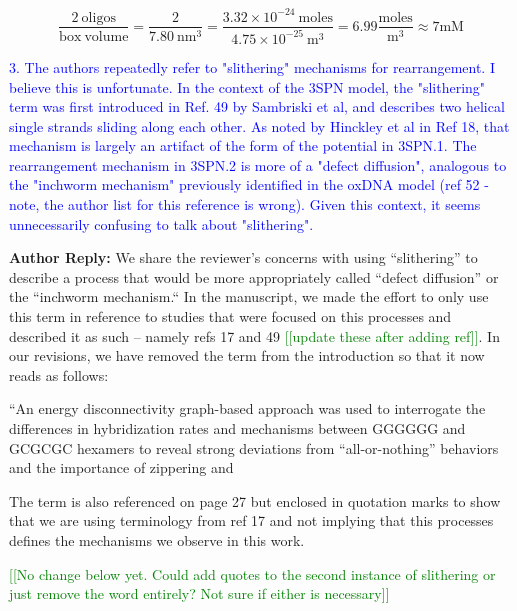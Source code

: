 \documentclass[11pt,a4paper]{letter} %
\newcommand*{\rood}[1]{{\color{red}{#1}}}
\newcommand*{\noteg}[1]{\textcolor{green}{[[#1]]}}		%
\begin{document}
    \begin{equation}\label{}
	\frac{2 \mathrm{\:oligos}}{\mathrm{box\:volume}} = \frac{2}{7.80\mathrm{\:nm}^3} = 
	\frac{3.32 \times 10^{-24} \mathrm{\:moles}}{4.75 \times 10^{-25} \mathrm{\:m}^3} = 
	6.99 \frac{\mathrm{moles}}{\mathrm{m}^3} \approx 7\mathrm{mM}
	\end{equation}

\textcolor{blue}{3.  The authors repeatedly refer to "slithering" mechanisms for rearrangement. I believe this is unfortunate. In the context of the 3SPN model, the "slithering" term was first introduced in Ref. 49 by Sambriski et al, and describes two helical single strands sliding along each other. As noted by Hinckley et al in Ref 18, that mechanism is largely an artifact of the form of the potential in 3SPN.1. The rearrangement mechanism in 3SPN.2 is more of a "defect diffusion", analogous to the "inchworm mechanism" previously identified in the oxDNA model (ref 52 - note, the author list for this reference is wrong). Given this context, it seems unnecessarily confusing to talk about "slithering".}

\textbf{Author Reply:}    We share the reviewer's concerns with using ``slithering'' to describe a process that would be more appropriately called ``defect diffusion'' or the ``inchworm mechanism.`` In the manuscript, we made the effort to only use this term in reference to studies that were focused on this processes and described it as such -- namely refs 17 and 49 \noteg{update these after adding ref}. In our revisions, we have removed the term from the introduction so that it now reads as follows:

``An energy disconnectivity graph-based approach was used to interrogate the differences in hybridization rates and mechanisms between GGGGGG and GCGCGC hexamers to reveal strong deviations from ``all-or-nothing'' behaviors and the importance of zippering and \rood{out-of-register diffusion mechanisms.~\citep{Xiao2019}''}

The term is also referenced on page 27 but enclosed in quotation marks to show that we are using terminology from ref 17 and not implying that this processes defines the mechanisms we observe in this work.

\noteg{No change below yet. Could add quotes to the second instance of slithering or just remove the word entirely? Not sure if either is necessary}

\rood{``Out-of-register states for 5$^\prime$-GCGCGC-3$^\prime$ hexamers were identified as deep kinetic traps along the hybridization pathway and ``slithering'' through these states did not provide a significant hybridization pathway compared to an alternative ``zippering'' mechanism. (In contrast, out-of-register slithering and in-register zippering served as two parallel pathways for hybridization of 5$^\prime$-GGGGGG-3$^\prime$.)'' }
\end{document}
